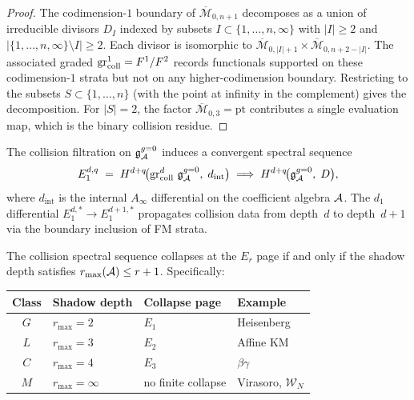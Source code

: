 \begin{proof}
The codimension-$1$ boundary of $\overline{\mathcal{M}}_{0,n+1}$
decomposes as a union of irreducible divisors
$D_I$ indexed by subsets $I \subset \{1,\dotsc,n,\infty\}$
with $|I| \geq 2$ and $|\{1,\dotsc,n,\infty\} \setminus I| \geq 2$.
Each divisor is isomorphic to
$\overline{\mathcal{M}}_{0,|I|+1} \times
\overline{\mathcal{M}}_{0,n+2-|I|}$.
The associated graded
$\operatorname{gr}_{\mathrm{coll}}^1 = F^1 / F^2$ records functionals supported on these
codimension-$1$ strata but not on any higher-codimension boundary.
Restricting to the subsets $S \subset \{1,\dotsc,n\}$ (with the
point at infinity in the complement) gives the decomposition.
For $|S| = 2$, the factor $\overline{\mathcal{M}}_{0,3} = \mathrm{pt}$
contributes a single evaluation map, which is the
binary collision residue.
\end{proof}

\begin{definition}
\label{def:thqg-V-collision-ss}
The collision filtration on $\mathfrak{g}^{g{=}0}_{\mathcal{A}}$ induces a
convergent spectral sequence
\begin{equation}\label{eq:thqg-V-collision-ss}
E_1^{d,q}
\;=\;
H^{d+q}\!\bigl(
 \operatorname{gr}_{\mathrm{coll}}^d\,\mathfrak{g}^{g{=}0}_{\mathcal{A}},\;
 d_{\mathrm{int}}
\bigr)
\;\Longrightarrow\;
H^{d+q}\!\bigl(
 \mathfrak{g}^{g{=}0}_{\mathcal{A}},\;D
\bigr),
\end{equation}
where $d_{\mathrm{int}}$ is the internal $A_\infty$ differential on
the coefficient algebra $\mathcal{A}$. The $d_1$ differential
$E_1^{d,*} \to E_1^{d+1,*}$ propagates collision data from depth~$d$
to depth~$d+1$ via the boundary inclusion of FM strata.
\end{definition}

\begin{proposition}
\label{prop:thqg-V-collapse-criterion}
The collision spectral sequence collapses at the $E_r$ page if and
only if the shadow depth satisfies $r_{\max}(\mathcal{A}) \leq r + 1$.
Specifically:
\begin{center}
\renewcommand{\arraystretch}{1.2}
\begin{tabular}{@{}clll@{}}
\toprule
\textbf{Class} & \textbf{Shadow depth} & \textbf{Collapse page}
 & \textbf{Example} \\
\midrule
$G$ & $r_{\max} = 2$ & $E_1$ & Heisenberg \\
$L$ & $r_{\max} = 3$ & $E_2$ & Affine KM \\
$C$ & $r_{\max} = 4$ & $E_3$ & $\beta\gamma$ \\
$M$ & $r_{\max} = \infty$ & no finite collapse & Virasoro, $\mathcal{W}_N$ \\
\bottomrule
\end{tabular}
\end{center}
\end{proposition}

